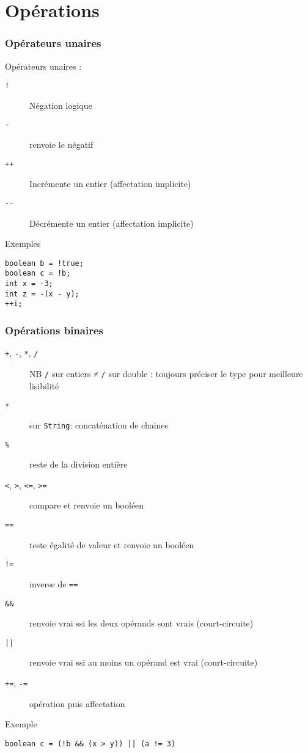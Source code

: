 \documentclass[english, french]{beamer}
\begin{document}
\section{Opérations}
\begin{frame}[fragile]
	\frametitle{Opérateurs unaires}
	Opérateurs unaires :
	\begin{description}
		\item[\texttt{!}] Négation logique
		\item[\texttt{-}] renvoie le négatif
		\item[\texttt{++}] Incrémente un entier (affectation implicite)
		\item[\texttt{-{}-}] Décrémente un entier (affectation implicite)
	\end{description}
	\begin{block}{Exemples}
		\begin{lstlisting}
boolean b = !true;
boolean c = !b;
int x = -3;
int z = -(x - y);
++i;
		\end{lstlisting}	
	\end{block}
\end{frame}

\begin{frame}[fragile]
	\frametitle{Opérations binaires}
	\begin{description}
		\item[\texttt{+}, \texttt{-}, \texttt{*}, \texttt{/}] NB \texttt{/} sur entiers ≠ \texttt{/} sur double : toujours préciser le type pour meilleure lisibilité
		\item[\texttt{+}] sur \texttt{String}: concaténation de chaines
		\item[\texttt{\%}] reste de la division entière
		\item[\texttt{<}, \texttt{>}, \texttt{<=}, \texttt{>=}] compare et renvoie un booléen
		\item[\texttt{==}] teste égalité de valeur et renvoie un booléen
		\item[\texttt{!=}] inverse de \texttt{==}
		\item[\texttt{\&\&}] renvoie vrai ssi les deux opérands sont vrais {\tiny (court-circuite)}
		\item[\texttt{||}] renvoie vrai ssi au moins un opérand est vrai {\tiny (court-circuite)}
		\item[\texttt{+=}, \texttt{-=}] opération puis affectation
	\end{description}
	\begin{block}{Exemple}
		\begin{lstlisting}
boolean c = (!b && (x > y)) || (a != 3)
		\end{lstlisting}	
	\end{block}
\end{frame}
\end{document}
